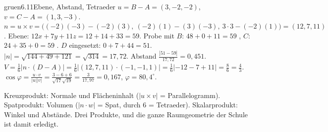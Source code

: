 \begin{loesungkarte}{gruen}{6.11}{Ebene, Abstand, Tetraeder}
$u = B - A = (3, -2, -2)$, $v = C - A = (1, 3, -3)$. $n = u\times v = \bigl((-2)(-3) - (-2)(3),\ (-2)(1) - (3)(-3),\ 3\cdot3 - (-2)(1)\bigr) = (12, 7, 11)$. Ebene: $12x + 7y + 11z = 12 + 14 + 33 = 59$. Probe mit $B$: $48 + 0 + 11 = 59$ \checkmark, $C$: $24 + 35 + 0 = 59$ \checkmark.
$D$ eingesetzt: $0 + 7 + 44 = 51$. $|n| = \sqrt{144 + 49 + 121} = \sqrt{314} = 17{,}72$. Abstand $\frac{|51 - 59|}{17{,}72} = 0{,}451$.
$V = \frac16|n\cdot(D - A)| = \frac16|(12, 7, 11)\cdot(-1, -1, 1)| = \frac16|-12 - 7 + 11| = \frac86 = \frac43$.
$\cos\varphi = \frac{u\cdot v}{|u||v|} = \frac{3 - 6 + 6}{\sqrt{17}\sqrt{19}} = \frac3{17{,}97} = 0{,}167$, $\varphi = 80{,}4^{\circ}$.
\begin{mitnehmen}\kastentext
Kreuzprodukt: Normale und Flächeninhalt ($|u\times v|$ = Parallelogramm). Spatprodukt: Volumen ($|n\cdot w|$ = Spat, durch $6$ = Tetraeder). Skalarprodukt: Winkel und Abstände. Drei Produkte, und die ganze Raumgeometrie der Schule ist damit erledigt.
\end{mitnehmen}
\end{loesungkarte}

